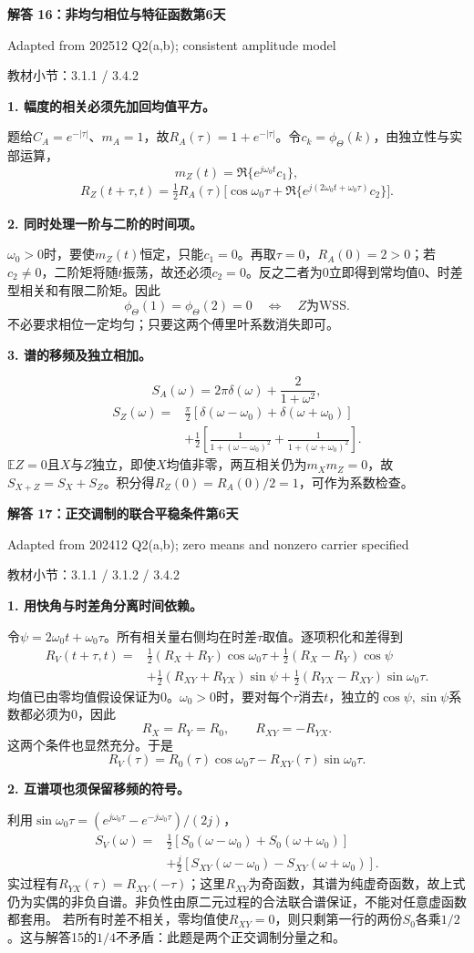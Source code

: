 \documentclass[10.5pt,fontset=fandol]{ctexart}
\newcommand{\E}{\mathbb E}\newcommand{\ee}{\mathrm e}\newcommand{\jj}{\mathrm j}
\newcommand{\qtitle}[2]{\par\addvspace{.85em}\Needspace{10\baselineskip}\begin{tcolorbox}[colback=navy,colframe=navy,arc=1.5pt,boxrule=0pt]\color{white}\large\bfseries #1\hfill\small #2\end{tcolorbox}}
\newcommand{\step}[1]{\par\addvspace{.4em}\Needspace{4\baselineskip}\textbf{#1}\par}\hypersetup{pdftitle={SSA Chapter 3 Review Solutions - Chinese}}
\begin{document}
\qtitle{解答 16：非均匀相位与特征函数}{第6天}
{\small\color{accentred}Adapted from 202512 Q2(a,b); consistent amplitude model}\par{\small\color{muted}教材小节：3.1.1 / 3.4.2}\par\smallskip\step{1. 幅度的相关必须先加回均值平方。}
题给$C_A=e^{-|\tau|}$、$m_A=1$，故$R_A(\tau)=1+e^{-|\tau|}$。令$c_k=\phi_\Theta(k)$，由独立性与实部运算，
\[m_Z(t)=\Re\{e^{j\omega_0t}c_1\},\]
\[\begin{aligned}R_Z(t+\tau,t)=\frac12R_A(\tau)\bigl[\cos\omega_0\tau
+\Re\{e^{j(2\omega_0t+\omega_0\tau)}c_2\}\bigr].\end{aligned}\]
\step{2. 同时处理一阶与二阶的时间项。}
$\omega_0>0$时，要使$m_Z(t)$恒定，只能$c_1=0$。再取$\tau=0$，$R_A(0)=2>0$；若$c_2\ne0$，二阶矩将随$t$振荡，故还必须$c_2=0$。反之二者为0立即得到常均值0、时差型相关和有限二阶矩。因此
\[\boxed{\phi_\Theta(1)=\phi_\Theta(2)=0\quad\Longleftrightarrow\quad Z\text{为WSS}}.\]
不必要求相位一定均匀；只要这两个傅里叶系数消失即可。
\step{3. 谱的移频及独立相加。}
\[S_A(\omega)=2\pi\delta(\omega)+\frac2{1+\omega^2},\]
\[\boxed{\begin{aligned}S_Z(\omega)={}&\frac\pi2[\delta(\omega-\omega_0)+\delta(\omega+\omega_0)]\\
&+\frac12\left[\frac1{1+(\omega-\omega_0)^2}+\frac1{1+(\omega+\omega_0)^2}\right].\end{aligned}}\]
$\E Z=0$且$X$与$Z$独立，即使$X$均值非零，两互相关仍为$m_Xm_Z=0$，故$\boxed{S_{X+Z}=S_X+S_Z}$。积分得$R_Z(0)=R_A(0)/2=1$，可作为系数检查。

\qtitle{解答 17：正交调制的联合平稳条件}{第6天}
{\small\color{accentred}Adapted from 202412 Q2(a,b); zero means and nonzero carrier specified}\par{\small\color{muted}教材小节：3.1.1 / 3.1.2 / 3.4.2}\par\smallskip\step{1. 用快角与时差角分离时间依赖。}
令$\psi=2\omega_0t+\omega_0\tau$。所有相关量右侧均在时差$\tau$取值。逐项积化和差得到
\[\begin{aligned}
R_V(t+\tau,t)={}&\tfrac12(R_X+R_Y)\cos\omega_0\tau
+\tfrac12(R_X-R_Y)\cos\psi\\
&+\tfrac12(R_{XY}+R_{YX})\sin\psi
+\tfrac12(R_{YX}-R_{XY})\sin\omega_0\tau.
\end{aligned}\]
均值已由零均值假设保证为0。$\omega_0>0$时，要对每个$\tau$消去$t$，独立的$\cos\psi,\sin\psi$系数都必须为0，因此
\[\boxed{R_X=R_Y=R_0,\qquad R_{XY}=-R_{YX}}.\]
这两个条件也显然充分。于是
\[\boxed{R_V(\tau)=R_0(\tau)\cos\omega_0\tau-R_{XY}(\tau)\sin\omega_0\tau}.\]
\step{2. 互谱项也须保留移频的符号。}
利用$\sin\omega_0\tau=(e^{j\omega_0\tau}-e^{-j\omega_0\tau})/(2j)$，
\[\boxed{\begin{aligned}S_V(\omega)={}&\tfrac12[S_0(\omega-\omega_0)+S_0(\omega+\omega_0)]\\
&+\tfrac j2[S_{XY}(\omega-\omega_0)-S_{XY}(\omega+\omega_0)].\end{aligned}}\]
实过程有$R_{YX}(\tau)=R_{XY}(-\tau)$；这里$R_{XY}$为奇函数，其谱为纯虚奇函数，故上式仍为实偶的非负自谱。非负性由原二元过程的合法联合谱保证，不能对任意虚函数都套用。
若所有时差不相关，零均值使$R_{XY}=0$，则只剩第一行的两份$S_0$各乘$1/2$。这与解答15的$1/4$不矛盾：此题是两个正交调制分量之和。
\end{document}
